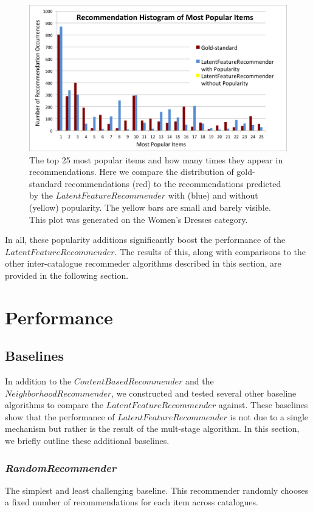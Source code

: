 \documentclass[11pt]{article}
\begin{document}
\begin{figure}[!htbp]
    \centering
    \includegraphics[width=1.0\textwidth]{PopularityHistogram2.png}
	\caption{The top 25 most popular items and how many times they appear in
    recommendations. Here we compare the distribution of gold-standard
    recommendations (red) to the recommendations predicted by the
    $LatentFeatureRecommender$ with (blue) and without (yellow) popularity. The
    yellow bars are small and barely visible. This plot was generated on the
    Women's Dresses category.}
    \label{fig:PopularityHistogram}
\end{figure}

In all, these popularity additions significantly boost the performance of the
\linebreak $LatentFeatureRecommender$. The results of this, along with
comparisons to the other inter-catalogue  recommeder algorithms described in
this section, are provided in the following section.

\pagebreak
\section*{Performance}
\subsection*{Baselines}
In addition to the $ContentBasedRecommender$ and the $NeighborhoodRecommender$,
we constructed and tested several other baseline algorithms to compare the
$LatentFeatureRecommender$ against. These baselines show that the performance of
$LatentFeatureRecommender$ is not due to a single mechanism but rather is the
result of the mult-stage algorithm. In this section, we briefly outline these
additional baselines.

\subsubsection*{\em RandomRecommender}
The simplest and least challenging baseline. This recommender randomly chooses a
fixed number of recommendations for each item across catalogues.
\end{document}
